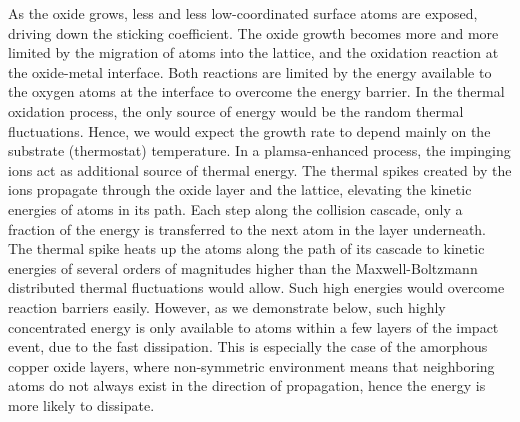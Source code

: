 \documentclass[manuscript=cmatex]{achemso}
\begin{document}
As the oxide grows, less and less low-coordinated surface  atoms are exposed, driving down the sticking coefficient. The oxide growth becomes more and more limited by the migration of  atoms into the  lattice, and the oxidation reaction at the oxide-metal interface. Both reactions are limited by the energy available to the oxygen atoms at the interface to overcome the energy barrier. In the thermal oxidation process, the only source of energy would be the random thermal fluctuations. Hence, we would expect the growth rate to depend mainly on the substrate (thermostat) temperature. In a plamsa-enhanced process, the impinging ions act as additional source of thermal energy. The thermal spikes created by the ions propagate through the oxide layer and the  lattice, elevating the kinetic energies of atoms in its path. Each step along the collision cascade, only a fraction of the energy is transferred to the next atom in the layer underneath. The thermal spike heats up the atoms along the path of its cascade to kinetic energies of several orders of magnitudes higher than the Maxwell-Boltzmann distributed thermal fluctuations would allow. Such high energies would overcome reaction barriers easily. However, as we demonstrate below, such highly concentrated energy is only available to atoms within a few layers of the impact event, due to the fast dissipation. This is especially the case of the amorphous copper oxide layers, where non-symmetric environment means that neighboring atoms do not always exist in the direction of propagation, hence the energy is more likely to dissipate.
\end{document}
